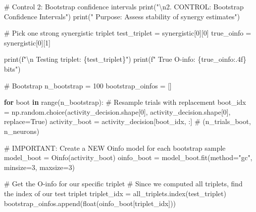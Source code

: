\documentclass[
  11pt,
  letterpaper,
  oneside,
  openany]{book}
\newenvironment{Shaded}{\begin{snugshade}}{\end{snugshade}}
\newcommand{\BuiltInTok}[1]{\textcolor[rgb]{0.00,0.23,0.31}{#1}}
\newcommand{\CharTok}[1]{\textcolor[rgb]{0.13,0.47,0.30}{#1}}
\newcommand{\CommentTok}[1]{\textcolor[rgb]{0.37,0.37,0.37}{#1}}
\newcommand{\ControlFlowTok}[1]{\textcolor[rgb]{0.00,0.23,0.31}{\textbf{#1}}}
\newcommand{\DecValTok}[1]{\textcolor[rgb]{0.68,0.00,0.00}{#1}}
\newcommand{\KeywordTok}[1]{\textcolor[rgb]{0.00,0.23,0.31}{\textbf{#1}}}
\newcommand{\NormalTok}[1]{\textcolor[rgb]{0.00,0.23,0.31}{#1}}
\newcommand{\OperatorTok}[1]{\textcolor[rgb]{0.37,0.37,0.37}{#1}}
\newcommand{\SpecialCharTok}[1]{\textcolor[rgb]{0.37,0.37,0.37}{#1}}
\newcommand{\SpecialStringTok}[1]{\textcolor[rgb]{0.13,0.47,0.30}{#1}}
\newcommand{\StringTok}[1]{\textcolor[rgb]{0.13,0.47,0.30}{#1}}
\newcommand{\VariableTok}[1]{\textcolor[rgb]{0.07,0.07,0.07}{#1}}
\begin{document}
\begin{Shaded}
\begin{Highlighting}[]
\CommentTok{\# Control 2: Bootstrap confidence intervals}
\BuiltInTok{print}\NormalTok{(}\StringTok{"}\CharTok{\textbackslash{}n}\StringTok{2. CONTROL: Bootstrap Confidence Intervals"}\NormalTok{)}
\BuiltInTok{print}\NormalTok{(}\StringTok{"   Purpose: Assess stability of synergy estimates"}\NormalTok{)}

\CommentTok{\# Pick one strong synergistic triplet}
\NormalTok{test\_triplet }\OperatorTok{=}\NormalTok{ synergistic[}\DecValTok{0}\NormalTok{][}\DecValTok{0}\NormalTok{]}
\NormalTok{true\_oinfo }\OperatorTok{=}\NormalTok{ synergistic[}\DecValTok{0}\NormalTok{][}\DecValTok{1}\NormalTok{]}

\BuiltInTok{print}\NormalTok{(}\SpecialStringTok{f"}\CharTok{\textbackslash{}n}\SpecialStringTok{   Testing triplet: }\SpecialCharTok{\{}\NormalTok{test\_triplet}\SpecialCharTok{\}}\SpecialStringTok{"}\NormalTok{)}
\BuiltInTok{print}\NormalTok{(}\SpecialStringTok{f"   True O{-}info: }\SpecialCharTok{\{}\NormalTok{true\_oinfo}\SpecialCharTok{:.4f\}}\SpecialStringTok{ bits"}\NormalTok{)}

\CommentTok{\# Bootstrap}
\NormalTok{n\_bootstrap }\OperatorTok{=} \DecValTok{100}
\NormalTok{bootstrap\_oinfos }\OperatorTok{=}\NormalTok{ []}

\ControlFlowTok{for}\NormalTok{ boot }\KeywordTok{in} \BuiltInTok{range}\NormalTok{(n\_bootstrap):}
    \CommentTok{\# Resample trials with replacement}
\NormalTok{    boot\_idx }\OperatorTok{=}\NormalTok{ np.random.choice(activity\_decision.shape[}\DecValTok{0}\NormalTok{], activity\_decision.shape[}\DecValTok{0}\NormalTok{], replace}\OperatorTok{=}\VariableTok{True}\NormalTok{)}
\NormalTok{    activity\_boot }\OperatorTok{=}\NormalTok{ activity\_decision[boot\_idx, :]  }\CommentTok{\# (n\_trials\_boot, n\_neurons)}
    
    \CommentTok{\# IMPORTANT: Create a NEW Oinfo model for each bootstrap sample}
\NormalTok{    model\_boot }\OperatorTok{=}\NormalTok{ Oinfo(activity\_boot)}
\NormalTok{    oinfo\_boot }\OperatorTok{=}\NormalTok{ model\_boot.fit(method}\OperatorTok{=}\StringTok{"gc"}\NormalTok{, minsize}\OperatorTok{=}\DecValTok{3}\NormalTok{, maxsize}\OperatorTok{=}\DecValTok{3}\NormalTok{)}
    
    \CommentTok{\# Get the O{-}info for our specific triplet}
    \CommentTok{\# Since we computed all triplets, find the index of our test triplet}
\NormalTok{    triplet\_idx }\OperatorTok{=}\NormalTok{ all\_triplets.index(test\_triplet)}
\NormalTok{    bootstrap\_oinfos.append(}\BuiltInTok{float}\NormalTok{(oinfo\_boot[triplet\_idx]))}


\end{Highlighting}
\end{Shaded}
\end{document}
